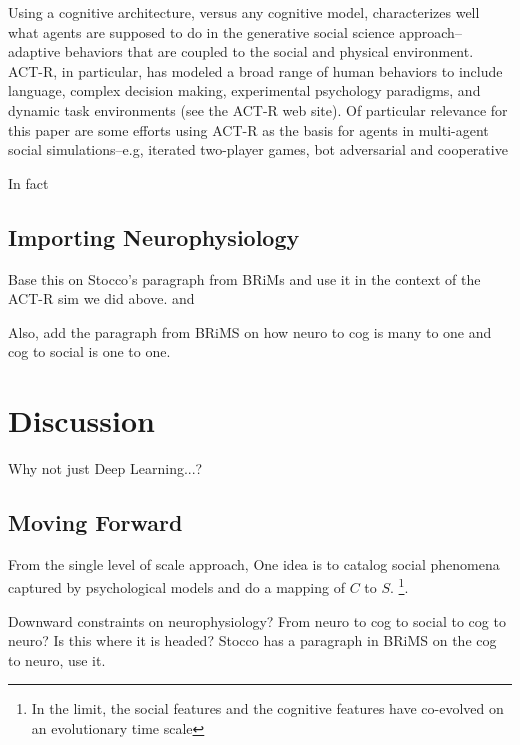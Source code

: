 \documentclass{article}
\begin{document}
Using a cognitive architecture, versus any cognitive model, characterizes well what agents are supposed to do in the generative social science approach--adaptive behaviors that are coupled to the social and physical environment.  ACT-R, in particular, has modeled a broad range of human behaviors to include language, complex decision making, experimental psychology paradigms, and dynamic task environments (see the ACT-R web site\cite{ACTRWEBSITE}).  Of particular relevance for this paper are some efforts using ACT-R as the basis for agents in multi-agent social simulations--e.g, iterated two-player games, bot adversarial and cooperative \cite{hi}

In fact

\subsection{Importing Neurophysiology}
Base this on Stocco's paragraph from BRiMs and use it in the context of the ACT-R sim we did above. and 

Also, add the paragraph from BRiMS on how neuro to cog is many to one and cog to social is one to one.


\section{Discussion}
Why not just Deep Learning...?  

\subsection{Moving Forward}
From the single level of scale approach, One idea is to catalog social phenomena captured by psychological models and do a mapping of $C$ to $S$. \footnote{In the limit, the social features and the cognitive features have co-evolved on an evolutionary time scale}.

Downward constraints on neurophysiology? From neuro to cog to social to cog to neuro?  Is this where it is headed? Stocco has a paragraph in BRiMS on the cog to neuro, use it.



  






\end{document}

